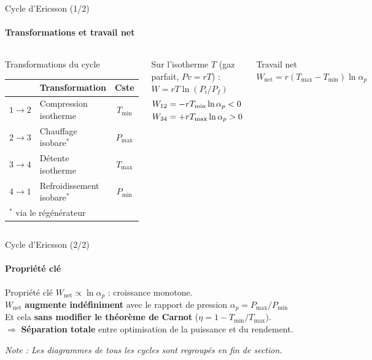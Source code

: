 \documentclass[aspectratio=43, 10pt]{beamer}
\newcommand{\resultbox}[2][R\'esultat cl\'e]{%
  \begin{alertblock}{#1}\centering$\displaystyle #2$\end{alertblock}}
\newcommand{\Tmin}{T_{\min}}
\newcommand{\Tmax}{T_{\max}}
\newcommand{\Pmin}{P_{\min}}
\newcommand{\Pmax}{P_{\max}}
\newcommand{\Wnet}{W_{\text{net}}}
\begin{document}
\begin{frame}{Cycle d'Ericsson (1/2)}
  \framesubtitle{Transformations et travail net}

  \begin{columns}[T,onlytextwidth]
      \begin{block}{Transformations du cycle}
        \small
        \renewcommand{\arraystretch}{1.2}
        \begin{tabular}{clc}
          \toprule
          & Transformation & Cste \\
          \midrule
          $1\!\to\!2$ & Compression isotherme      & $\Tmin$ \\
          $2\!\to\!3$ & Chauffage isobare$^*$ & $\Pmax$ \\
          $3\!\to\!4$ & D\'etente isotherme        & $\Tmax$ \\
          $4\!\to\!1$ & Refroidissement isobare$^*$ & $\Pmin$ \\
          \bottomrule
          \multicolumn{3}{l}{\tiny $^*$ via le r\'eg\'en\'erateur}
        \end{tabular}
      \end{block}

      \small Sur l'isotherme $T$ (gaz parfait, $Pv=rT$) :\\
      $W = rT\ln(P_i/P_f)$
      \begin{align*}\small
        W_{12} &= -r\Tmin\ln\alpha_p < 0 \\
        W_{34} &= +r\Tmax\ln\alpha_p > 0
      \end{align*}

      \vspace{0.5em}
      \resultbox[Travail net]{%
        \Wnet = r(\Tmax-\Tmin)\ln\alpha_p}
  \end{columns}
\end{frame}

\begin{frame}{Cycle d'Ericsson (2/2)}
  \framesubtitle{Propri\'et\'e cl\'e}
  
  \begin{exampleblock}{Propri\'et\'e cl\'e}
    \normalsize
    $\Wnet \propto \ln\alpha_p$ : croissance monotone.\\[2pt]
    $\Wnet$ \textbf{augmente ind\'efiniment} avec le rapport de pression $\alpha_p=\Pmax/\Pmin$\\[2pt]
    Et cela \textbf{sans modifier le th\'eor\`eme de Carnot} ($\eta = 1 - \Tmin/\Tmax$).\\[2pt]
    $\Rightarrow$ \textbf{S\'eparation totale} entre optimisation de la puissance et du rendement.
  \end{exampleblock}

  \vspace{2em}
  \begin{block}{}
     \small
     \textit{Note : Les diagrammes de tous les cycles sont regroup\'es en fin de section.}
  \end{block}
\end{frame}
\end{document}
